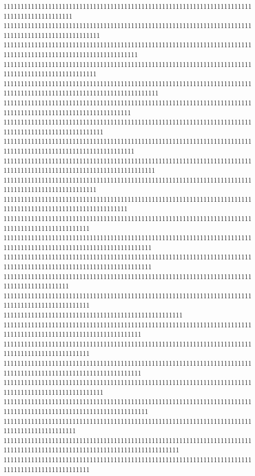 11111111111111111111111111111111111111111111111111111111111111111111111111111111111111111111
1111111111111111111111111111111111111111111111111111111111111111111111111111111111111111111111111111
111111111111111111111111111111111111111111111111111111111111111111111111111111111111111111111111111111111111111
111111111111111111111111111111111111111111111111111111111111111111111111111111111111111111111111111
111111111111111111111111111111111111111111111111111111111111111111111111111111111111111111111111111111111111111111111
1111111111111111111111111111111111111111111111111111111111111111111111111111111111111111111111111111111111111
11111111111111111111111111111111111111111111111111111111111111111111111111111111111111111111111111111
11111111111111111111111111111111111111111111111111111111111111111111111111111111111111111111111111111111111111
11111111111111111111111111111111111111111111111111111111111111111111111111111111111111111111111111111111111111111111
111111111111111111111111111111111111111111111111111111111111111111111111111111111111111111111111111
111111111111111111111111111111111111111111111111111111111111111111111111111111111111111111111111111111111111
1111111111111111111111111111111111111111111111111111111111111111111111111111111111111111111111111
1111111111111111111111111111111111111111111111111111111111111111111111111111111111111111111111111111111111111111111
1111111111111111111111111111111111111111111111111111111111111111111111111111111111111111111111111111111111111111111
1111111111111111111111111111111111111111111111111111111111111111111111111111111111111111111
1111111111111111111111111111111111111111111111111111111111111111111111111111111111111111111111111
1111111111111111111111111111111111111111111111111111
1111111111111111111111111111111111111111111111111111111111111111111111111111111111111111111111111111111111111111
1111111111111111111111111111111111111111111111111111111111111111111111111111111111111111111111111
1111111111111111111111111111111111111111111111111111111111111111111111111111111111111111111111111111111111111111
11111111111111111111111111111111111111111111111111111111111111111111111111111111111111111111111111111
111111111111111111111111111111111111111111111111111111111111111111111111111111111111111111111111111111111111111111
111111111111111111111111111111111111111111111111111111111111111111111111111111111111111111111
111111111111111111111111111111111111111111111111111111111111111111111111111111111111111111111111111111111111111111111111111
1111111111111111111111111111111111111111111111111111111111111111111111111111111111111111111111111
